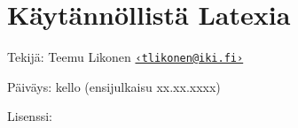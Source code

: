 
\null\vfill

{
  \setlength{\parindent}{0em}
  \setlength{\parskip}{1.2ex}

  \section*{Käytännöllistä Latexia}

  Tekijä: Teemu Likonen
  \href{mailto:tlikonen@iki.fi}{\nolinkurl{‹tlikonen@iki.fi›}}

  Päiväys: \DTMtoday{} kello \DTMcurrenttime{} (ensijulkaisu xx.xx.xxxx)

  Lisenssi:

}
